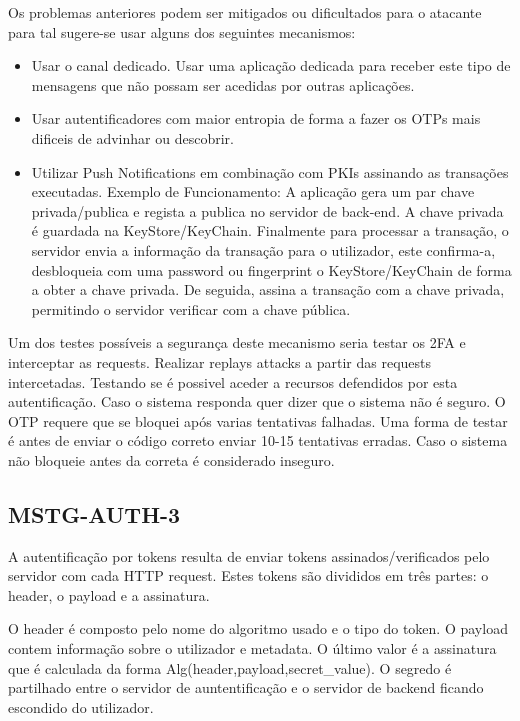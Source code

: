 Os problemas anteriores podem ser mitigados ou dificultados para o atacante para tal sugere-se usar alguns dos seguintes mecanismos:

\begin{itemize}

\item Usar o canal dedicado. Usar uma aplicação dedicada para receber este tipo de mensagens que não possam ser acedidas por outras aplicações.

\item Usar autentificadores com maior entropia de forma a fazer os OTPs mais dificeis de advinhar ou descobrir.

\item Utilizar Push Notifications em combinação com PKIs assinando as transações executadas. Exemplo de Funcionamento: A aplicação gera um par chave privada/publica e regista a publica no servidor de back-end. A chave privada é guardada na KeyStore/KeyChain. Finalmente para processar a transação, o servidor envia a informação da transação para o utilizador, este confirma-a, desbloqueia com uma password ou fingerprint o KeyStore/KeyChain de forma a obter a chave privada. De seguida, assina a transação com a chave privada, permitindo o servidor verificar com a chave pública.

\end{itemize}

	Um dos testes possíveis a segurança deste mecanismo seria testar os 2FA e interceptar as requests. Realizar replays attacks a partir das requests intercetadas. Testando se é possivel aceder a recursos defendidos por esta autentificação. Caso o sistema responda quer dizer que o sistema não é seguro.
	O OTP requere que se bloquei após varias tentativas falhadas. Uma forma de testar é antes de enviar o código correto enviar 10-15 tentativas erradas. Caso o sistema não bloqueie antes da correta é considerado inseguro.


\subsection{ MSTG-AUTH-3 }

A autentificação por tokens resulta de enviar tokens assinados/verificados pelo servidor com cada HTTP request. Estes tokens são divididos em três partes: o header, o payload e a assinatura.

O header é composto pelo nome do algoritmo usado e o tipo do token. O payload contem informação sobre o utilizador e metadata. O último valor é a assinatura que é calculada da forma Alg(header,payload,secret\_value). O segredo é partilhado entre o servidor de auntentificação e o servidor de backend ficando escondido do utilizador.

